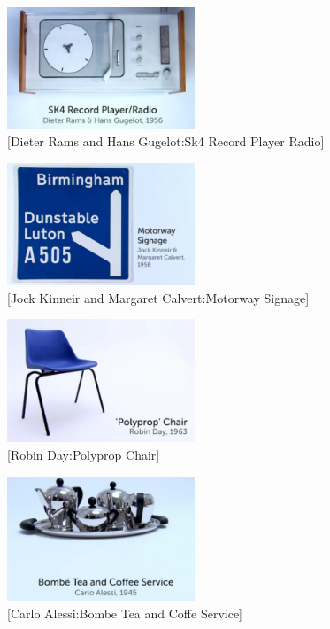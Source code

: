 \documentclass[UTF8]{../../../../RepresentationUniverse}
\begin{document}
\begin{figure}[h]
    \centering
    \includegraphics[width=0.5\textwidth]{./src/figures/Sk4 Record Player Radio_2023-04-09_20-40-36.png}
    \caption{[Dieter Rams and Hans Gugelot:Sk4 Record Player Radio]}
    \label{figure:Sk4 Record Player Radio}
\end{figure}


\begin{figure}[h]
    \centering
    \includegraphics[width=0.5\textwidth]{./src/figures/Motorway Signage_2023-04-09_20-43-34.png}
    \caption{[Jock Kinneir and Margaret Calvert:Motorway Signage]}
    \label{figure:Motorway Signage}
\end{figure}


\begin{figure}[h]
    \centering
    \includegraphics[width=0.5\textwidth]{./src/figures/Polyprop Chair_2023-04-09_20-46-07.png}
    \caption{[Robin Day:Polyprop Chair]}
    \label{figure:Polyprop Chair}
\end{figure}


\begin{figure}[h]
    \centering
    \includegraphics[width=0.5\textwidth]{./src/figures/Bombe Tea and Coffe Service_2023-04-09_20-49-08.png}
    \caption{[Carlo Alessi:Bombe Tea and Coffe Service]}
    \label{figure:Bombe Tea and Coffe Service}
\end{figure}
\end{document}

